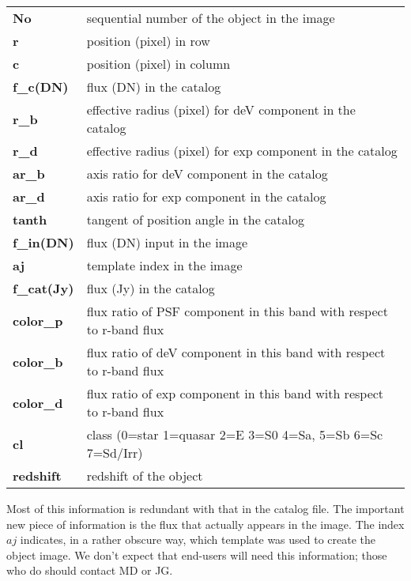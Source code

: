 \begin{tabular}{ll}
{\bf No}  & sequential number of the object in the image \\

{\bf r}   &    position (pixel) in row  \\

{\bf c}   &    position (pixel) in column  \\

{\bf f\_c(DN)} &flux (DN) in the catalog \\

{\bf r\_b} &  effective radius (pixel) for deV component in the catalog \\

{\bf r\_d} &   effective radius (pixel) for exp component in the catalog \\

{\bf ar\_b}&   axis ratio for deV component in the catalog \\

{\bf ar\_d}&   axis ratio for exp component in the catalog  \\

{\bf tanth}&   tangent of position angle in the catalog  \\

{\bf f\_in(DN)}& flux (DN) input in the image \\

{\bf aj}  &   template index in the image  \\

{\bf f\_cat(Jy)}& flux (Jy) in the catalog \\

{\bf color\_p} & flux ratio of PSF component in this band with respect to r-band flux \\

{\bf color\_b} &  flux ratio of deV component in this band with respect to r-band flux \\

{\bf color\_d} &  flux ratio of exp component in this band with respect to r-band flux \\

{\bf cl}     &  class (0=star 1=quasar 2=E 3=S0 4=Sa, 5=Sb 6=Sc 7=Sd/Irr) \\

{\bf redshift}     &  redshift of the object \\
\end{tabular}

Most of this information is redundant with that in the catalog file.
The important new piece of information is the flux that actually appears
in the image.  The index $aj$ indicates, in a rather obscure way,
which template was used to create the object image.  We don't expect
that end-users will need this information; those who do should contact
MD or JG.

